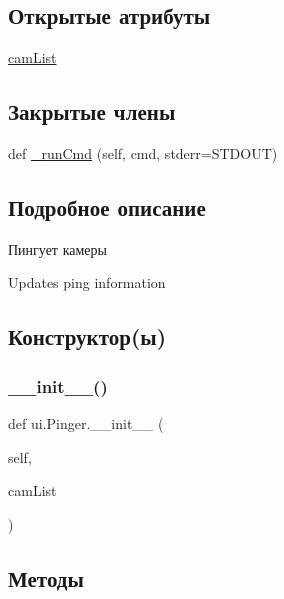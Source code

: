 \subsection*{Открытые атрибуты}
\begin{DoxyCompactItemize}
\item 
\hyperlink{classui_1_1_pinger_ac752aa12f824b1fd0ce9b94f7b3b14fe}{cam\+List}
\end{DoxyCompactItemize}
\subsection*{Закрытые члены}
\begin{DoxyCompactItemize}
\item 
def \hyperlink{classui_1_1_pinger_a761e237a3492d45b892b61bd9ee7945d}{\+\_\+run\+Cmd} (self, cmd, stderr=S\+T\+D\+O\+UT)
\end{DoxyCompactItemize}


\subsection{Подробное описание}
Пингует камеры 

\begin{DoxyVerb}Updates ping information \end{DoxyVerb}
 

\subsection{Конструктор(ы)}
\mbox{\label{classui_1_1_pinger_a6e76192168383c7fbb72d6add7f27e80}} 
\subsubsection{\texorpdfstring{\+\_\+\+\_\+init\+\_\+\+\_\+()}{\_\_init\_\_()}}
{\footnotesize\ttfamily def ui.\+Pinger.\+\_\+\+\_\+init\+\_\+\+\_\+ (\begin{DoxyParamCaption}\item[{}]{self,  }\item[{}]{cam\+List }\end{DoxyParamCaption})}



\subsection{Методы}
\mbox{\label{classui_1_1_pinger_a761e237a3492d45b892b61bd9ee7945d}} 
